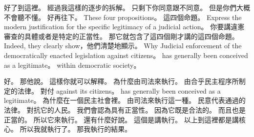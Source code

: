 \hypertarget{w02:cue:1649}{}好了到這裡。
\hypertarget{w02:cue:1650}{}經過我這樣的逐步的拆解。
\hypertarget{w02:cue:1651}{}只剩下你同意跟不同意。
\hypertarget{w02:cue:1652}{}但是你們大概不會聽不懂。
\hypertarget{w02:cue:1653}{}好再往下。
\hypertarget{w02:cue:1654}{}These four propositions。
\hypertarget{w02:cue:1655}{}這四個命題。
\hypertarget{w02:cue:1656}{}Express the modern justification for the specific legitimacy of a judicial action。
\hypertarget{w02:cue:1657}{}你要講違憲審查的具體或者是特定的正當性。
\hypertarget{w02:cue:1658}{}那它就包含了這四個剛才講的這四個命題。
\hypertarget{w02:cue:1659}{}Indeed, they clearly show，他們清楚地顯示。
\hypertarget{w02:cue:1660}{}Why Judicial enforcement of the democratically enacted legislation against citizens。
\hypertarget{w02:cue:1661}{}has generally been conceived as a legitimate。
\hypertarget{w02:cue:1662}{}within democratic society。

\hypertarget{w02:cue:1663}{}好。
\hypertarget{w02:cue:1664}{}那他說。
\hypertarget{w02:cue:1665}{}這樣你就可以解釋。
\hypertarget{w02:cue:1666}{}為什麼由司法來執行。
\hypertarget{w02:cue:1667}{}由合乎民主程序所制定的法律。
\hypertarget{w02:cue:1668}{}對付 against its citizens。
\hypertarget{w02:cue:1669}{}has generally been conceived as a legitimate。
\hypertarget{w02:cue:1670}{}為什麼在一個民主社會裡。
\hypertarget{w02:cue:1671}{}由司法來執行這一種。
\hypertarget{w02:cue:1672}{}民意代表通過的法律。
\hypertarget{w02:cue:1673}{}對抗它的人民。
\hypertarget{w02:cue:1674}{}我們會認為具有正當性。
\hypertarget{w02:cue:1675}{}因為它既是合法的。
\hypertarget{w02:cue:1676}{}而且也是正當的。
\hypertarget{w02:cue:1677}{}所以它來執行。
\hypertarget{w02:cue:1678}{}還有什麼好說。
\hypertarget{w02:cue:1679}{}這個是講執行。
\hypertarget{w02:cue:1680}{}以上到這裡都是講核心。
\hypertarget{w02:cue:1681}{}所以我就執行了。
\hypertarget{w02:cue:1682}{}那我執行的結果。

